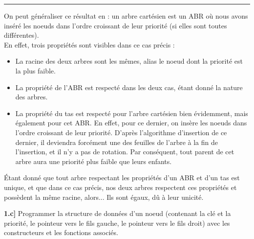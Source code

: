 \documentclass[a4paper,12pt]{report}
\begin{document}
\begin{tcolorbox}[colback=gray!10, colframe=blue!30, coltitle=black, title=Réponse à la 1.b - 1/1]
    \vspace{0.5cm}
    \hrule
    \vspace{0.5cm}

    On peut généraliser ce résultat en : un arbre cartésien est un ABR où nous avons inséré les noeuds dans l'ordre croissant de leur priorité (si elles sont toutes différentes).\\

    En effet, trois propriétés sont visibles dans ce cas précis :\\[-0.4cm]
    \begin{itemize}
        \item La racine des deux arbres sont les mêmes, alias le noeud dont la priorité est la plus faible.
        \item La propriété de l'ABR est respecté dans les deux cas, étant donné la nature des arbres.
        \item La propriété du tas est respecté pour l'arbre cartésien bien évidemment, mais également pour cet ABR. En effet, pour ce dernier, on insère les noeuds dans l'ordre croissant de leur priorité. D'après l'algorithme d'insertion de ce dernier, il deviendra forcément une des feuilles de l'arbre à la fin de l'insertion, et il n'y a pas de rotation. Par conséquent, tout parent de cet arbre aura une priorité plus faible que leurs enfants.
    \end{itemize}

    \vspace{0.5cm}

    Étant donné que tout arbre respectant les propriétés d'un ABR et d'un tas est unique, et que dans ce cas précis, nos deux arbres respectent ces propriétés et possèdent la même racine, alors... Ils sont égaux, dû à leur unicité.

\end{tcolorbox}




\newpage
{}

\textbf{1.c]} Programmer la structure de données d'un noeud (contenant la clé et la priorité, le pointeur vers le fils gauche, le pointeur vers le fils droit) avec les constructeurs et les fonctions associés.
\end{document}
